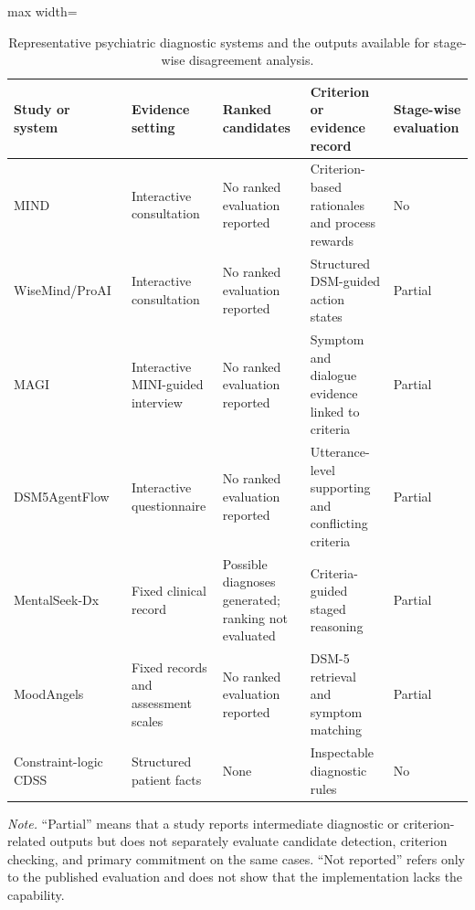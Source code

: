 \begin{table}[htbp]
\centering
\caption{Representative psychiatric diagnostic systems and the outputs available for stage-wise disagreement analysis.}
\label{tab:related-work-matrix}
\small
\begin{adjustbox}{max width=\textwidth}
\begin{tabular}{|>{\raggedright\arraybackslash}p{2.5cm}|>{\raggedright\arraybackslash}p{2.7cm}|>{\raggedright\arraybackslash}p{3.1cm}|>{\raggedright\arraybackslash}p{4.3cm}|>{\centering\arraybackslash}p{2.0cm}|}
\hline
Study or system & Evidence setting & Ranked candidates & Criterion or evidence record & Stage-wise evaluation\\
\hline
MIND~\citep{li2026mind} & Interactive consultation & No ranked evaluation reported & Criterion-based rationales and process rewards & No\\
\hline
WiseMind/\allowbreak ProAI~\citep{wu2026wisemind} & Interactive consultation & No ranked evaluation reported & Structured DSM-guided action states & Partial\\
\hline
MAGI~\citep{bi2025magi} & Interactive MINI-guided interview & No ranked evaluation reported & Symptom and dialogue evidence linked to criteria & Partial\\
\hline
DSM5Agent\allowbreak Flow~\citep{ozgun2025dsm5agentflow} & Interactive questionnaire & No ranked evaluation reported & Utterance-level supporting and conflicting criteria & Partial\\
\hline
MentalSeek-Dx~\citep{sun2026mentalseek} & Fixed clinical record & Possible diagnoses generated; ranking not evaluated & Criteria-guided staged reasoning & Partial\\
\hline
Mood\allowbreak Angels~\citep{xiao2025moodangels} & Fixed records and assessment scales & No ranked evaluation reported & DSM-5 retrieval and symptom matching & Partial\\
\hline
Constraint-logic CDSS~\citep{kim2025clp} & Structured patient facts & None & Inspectable diagnostic rules & No\\
\hline
\end{tabular}
\end{adjustbox}

\vspace{0.4em}
\begin{minipage}{0.98\textwidth}
\footnotesize
\textit{Note.} ``Partial'' means that a study reports intermediate diagnostic or criterion-related outputs but does not separately evaluate candidate detection, criterion checking, and primary commitment on the same cases. ``Not reported'' refers only to the published evaluation and does not show that the implementation lacks the capability.
\end{minipage}
\end{table}
\FloatBarrier


